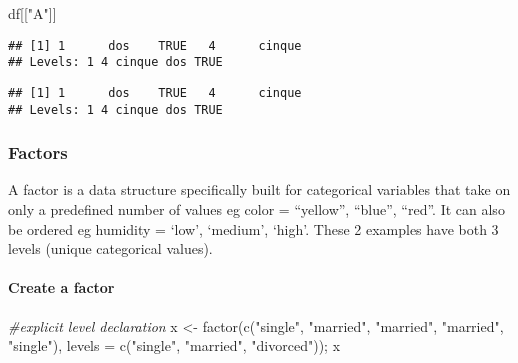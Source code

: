 \documentclass[
]{article}
\newenvironment{Shaded}{\begin{snugshade}}{\end{snugshade}}
\newcommand{\AttributeTok}[1]{\textcolor[rgb]{0.77,0.63,0.00}{#1}}
\newcommand{\CommentTok}[1]{\textcolor[rgb]{0.56,0.35,0.01}{\textit{#1}}}
\newcommand{\FunctionTok}[1]{\textcolor[rgb]{0.00,0.00,0.00}{#1}}
\newcommand{\NormalTok}[1]{#1}
\newcommand{\OtherTok}[1]{\textcolor[rgb]{0.56,0.35,0.01}{#1}}
\newcommand{\SpecialCharTok}[1]{\textcolor[rgb]{0.00,0.00,0.00}{#1}}
\newcommand{\StringTok}[1]{\textcolor[rgb]{0.31,0.60,0.02}{#1}}
\begin{document}
\begin{Shaded}
\begin{Highlighting}[]
\NormalTok{df[[}\StringTok{"A"}\NormalTok{]]}
\end{Highlighting}
\end{Shaded}

\begin{verbatim}
## [1] 1      dos    TRUE   4      cinque
## Levels: 1 4 cinque dos TRUE
\end{verbatim}

\begin{Shaded}
\end{Shaded}

\begin{verbatim}
## [1] 1      dos    TRUE   4      cinque
## Levels: 1 4 cinque dos TRUE
\end{verbatim}

\hypertarget{factors}{%
\subsubsection{Factors}\label{factors}}

A factor is a data structure specifically built for categorical
variables that take on only a predefined number of values eg color =
``yellow'', ``blue'', ``red''. It can also be ordered eg humidity =
`low', `medium', `high'. These 2 examples have both 3 levels (unique
categorical values).

\hypertarget{create-a-factor}{%
\paragraph{Create a factor}\label{create-a-factor}}

\begin{Shaded}
\begin{Highlighting}[]
\CommentTok{\#explicit level declaration}
\NormalTok{x }\OtherTok{\textless{}{-}} \FunctionTok{factor}\NormalTok{(}\FunctionTok{c}\NormalTok{(}\StringTok{"single"}\NormalTok{, }\StringTok{"married"}\NormalTok{, }\StringTok{"married"}\NormalTok{, }\StringTok{"married"}\NormalTok{, }\StringTok{"single"}\NormalTok{), }
            \AttributeTok{levels =} \FunctionTok{c}\NormalTok{(}\StringTok{"single"}\NormalTok{, }\StringTok{"married"}\NormalTok{, }\StringTok{"divorced"}\NormalTok{));}
\NormalTok{x}
\end{Highlighting}
\end{Shaded}
\end{document}

